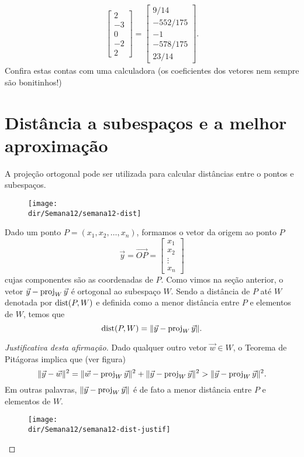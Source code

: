 \documentclass[../livro.tex]{subfiles}  %
\providecommand{\dir}{..}
\begin{document}
\begin{example}
\begin{align*}
\begin{bmatrix}
 2\\-3\\0\\-2\\ 2
\end{bmatrix} =
\begin{bmatrix}
 9/14 \\ -552/175 \\ -1 \\ -578/175 \\ 23/14
\end{bmatrix}.
  \end{align*}
Confira estas contas com uma calculadora (os coeficientes dos vetores nem sempre são bonitinhos!)
\end{example}



\section{Distância a subespaços e a melhor aproximação}


A projeção ortogonal pode ser utilizada para calcular distâncias entre o pontos e subespaços.

\begin{figure}[h!]
\begin{center}
\texttt{[image: \\dir/Semana12/semana12-dist]}
\end{center}
\end{figure}

\noindent Dado um ponto $P = (x_1, x_2, \dots, x_n)$, formamos o vetor da origem ao ponto $P$
\[
\vec{y} = \vec{OP} =
\begin{bmatrix}
x_1 \\ x_2 \\ \vdots \\ x_n
\end{bmatrix}
\] cujas componentes são as coordenadas de $P$. Como vimos na seção anterior, o vetor $\vec{y} - \operatorname{proj}_{W} \vec{y}$ é ortogonal ao subespaço $W$. Sendo a distância de $P$ até $W$ denotada por $\operatorname{dist} (P,W)$ e definida como a menor distância entre $P$ e elementos de $W$, temos que
\[
\operatorname{dist} (P,W) = \|\vec{y} - \operatorname{proj}_{W} \vec{y}\|.
\]


\begin{proof}[Justificativa desta afirmação]
Dado qualquer outro vetor $\vec{w} \in W$, o Teorema de Pitágoras implica que (ver figura)
\[
\| \vec{y} - \vec{w} \|^2 = \| \vec{w} - \operatorname{proj}_{W} \vec{y}\|^2 + \| \vec{y} - \operatorname{proj}_{W} \vec{y}\|^2 > \| \vec{y} - \operatorname{proj}_{W} \vec{y}\|^2.
\] Em outras palavras, $\|\vec{y} - \operatorname{proj}_{W} \vec{y}\|$ é de fato a menor distância entre $P$ e elementos de $W$.
\begin{figure}[h!]
\begin{center}
\texttt{[image: \\dir/Semana12/semana12-dist-justif]}
\end{center}
\end{figure}
\end{proof}
\end{document}
